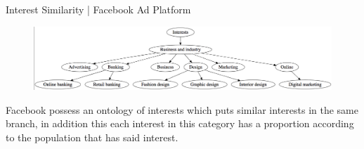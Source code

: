 \documentclass{beamer}
\begin{document}
    \begin{frame}{Interest Similarity | Facebook Ad Platform}
        \begin{figure}
            \includegraphics[width=\textwidth]{images/ontology.png}
        \end{figure}
    
        Facebook possess an ontology of interests which puts similar interests in the same branch, in addition this each interest in this category has a proportion according to the population that has said interest.
    \end{frame}
    
\end{document}
